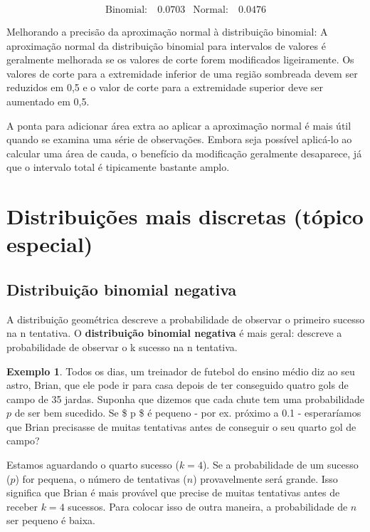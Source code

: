 \documentclass[
]{book}
\theoremstyle{definition}
\theoremstyle{definition}
\newtheorem{example}{Exemplo}[chapter]
\theoremstyle{definition}
\theoremstyle{definition}
\theoremstyle{remark}
\begin{document}
\begin{align*}
\text{Binomial:}&\ 0.0703
&\text{Normal:}&\ 0.0476
\end{align*}

Melhorando a precisão da aproximação normal à distribuição binomial: A aproximação normal da distribuição binomial para intervalos de valores é geralmente melhorada se os valores de corte forem modificados ligeiramente. Os valores de corte para a extremidade inferior de uma região sombreada devem ser reduzidos em 0,5 e o valor de corte para a extremidade superior deve ser aumentado em 0,5.

A ponta para adicionar área extra ao aplicar a aproximação normal é mais útil quando se examina uma série de observações. Embora seja possível aplicá-lo ao calcular uma área de cauda, o benefício da modificação geralmente desaparece, já que o intervalo total é tipicamente bastante amplo.

\hypertarget{discreteDistribuiton}{%
\section{Distribuições mais discretas (tópico especial)}\label{discreteDistribuiton}}

\hypertarget{negativeBinomialDistribution}{%
\subsection{Distribuição binomial negativa}\label{negativeBinomialDistribution}}

A distribuição geométrica descreve a probabilidade de observar o primeiro sucesso na n tentativa. O \textbf{distribuição binomial negativa} é mais geral: descreve a probabilidade de observar o k sucesso na n tentativa.

\begin{example}
\protect\hypertarget{exm:unnamed-chunk-141}{}{\label{exm:unnamed-chunk-141} }Todos os dias, um treinador de futebol do ensino médio diz ao seu astro, Brian, que ele pode ir para casa depois de ter conseguido quatro gols de campo de 35 jardas. Suponha que dizemos que cada chute tem uma probabilidade \(p\) de ser bem sucedido. Se \$ p \$ é pequeno - por ex. próximo a 0.1 - esperaríamos que Brian precisasse de muitas tentativas antes de conseguir o seu quarto gol de campo?
\end{example}

Estamos aguardando o quarto sucesso (\(k=4\)). Se a probabilidade de um sucesso (\(p\)) for pequena, o número de tentativas (\(n\)) provavelmente será grande. Isso significa que Brian é mais provável que precise de muitas tentativas antes de receber \(k=4\) sucessos. Para colocar isso de outra maneira, a probabilidade de \(n\) ser pequeno é baixa.
\end{document}
